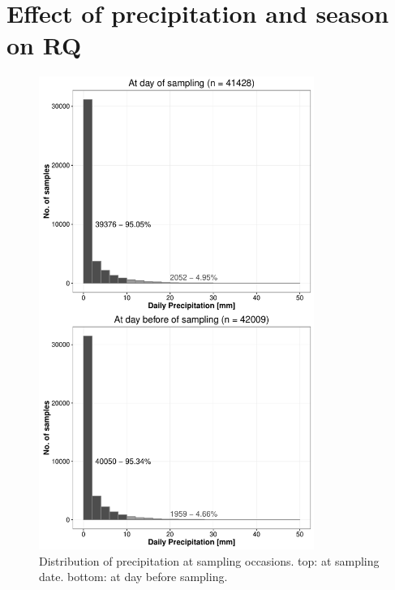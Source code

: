 \documentclass[pdftex,a4paper]{scrreprt}
\begin{document}
\chapter{Effect of precipitation and season on RQ}
\begin{figure}[h]
	\centering
	\includegraphics[width = 0.8\textwidth]{precip}
	\caption[Distribution of precipitation at sampling occasions.]{Distribution of precipitation at sampling occasions. top: at sampling date. bottom: at day before sampling.}
	\label{fig:precip}
\end{figure}



\end{document}
